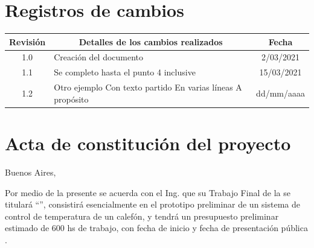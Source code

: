 \documentclass[11pt]{charter}
\begin{document}
\maketitle
\thispagestyle{empty}
\pagebreak


\thispagestyle{empty}
{\setlength{\parskip}{0pt}
\tableofcontents{}
}
\pagebreak


\section{Registros de cambios}
\label{sec:registro}


\begin{table}[ht]
\label{tab:registro}
\centering
\begin{tabularx}{\linewidth}{@{}|c|X|c|@{}}
\hline
\rowcolor[HTML]{C0C0C0} 
Revisión & \multicolumn{1}{c|}{\cellcolor[HTML]{C0C0C0}Detalles de los cambios realizados} & Fecha      \\ \hline
1.0      & Creación del documento                                          & 2/03/2021 \\ \hline
1.1      & Se completo hasta el punto 4 inclusive & 15/03/2021 \\ \hline
1.2      & Otro ejemplo \newline
		   Con texto partido \newline
		   En varias líneas \newline
		   A propósito                                                     & dd/mm/aaaa \\ \hline
\end{tabularx}
\end{table}

\pagebreak



\section{Acta de constitución del proyecto}
\label{sec:acta}

\begin{flushright}
Buenos Aires, \fechaInicioName
\end{flushright}

\vspace{2cm}

Por medio de la presente se acuerda con el Ing. \authorname\hspace{1px} que su Trabajo Final de la \degreename\hspace{1px} se titulará ``\ttitle'', consistirá esencialmente en el prototipo preliminar de un sistema de control de temperatura de un calefón, y tendrá un presupuesto preliminar estimado de 600 hs de trabajo, con fecha de inicio \fechaInicioName\hspace{1px} y fecha de presentación pública \fechaFinalName.
\end{document}
